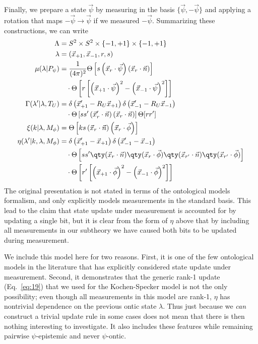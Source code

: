 \documentclass[%
 reprint,
superscriptaddress,
nofootinbib,
 amsmath,amssymb,
 prx, 
 accepted=2019-09-27,
]{quantumarticle}
\begin{document}
Finally, we prepare a state $\vec\psi$ by measuring in the basis
$\{\vec\psi,-\vec\psi\}$ and applying a rotation that maps
$-\vec\psi\to\vec\psi$ if we measured $-\vec\psi$. Summarizing these
constructions, we can write
\begin{align}
  \Lambda &= S^2\times S^2\times\{-1,+1\}\times\{-1,+1\}\nonumber\\
  \lambda &= (\vec x_{+1},\vec x_{-1}, r,s)\nonumber\\
  \mu(\lambda|P_\psi)
          &= \frac{1}{(4\pi)^2}  \Theta\left[ s\left(\vec x_{r}\cdot\vec\psi \right)\left(\vec x_{r}\cdot\vec n \right) \right]\nonumber\\
          &\quad\cdot\Theta\left[ r\left[
            \left( \vec x_{+1}\cdot\vec \psi \right)^2
            -\left( \vec x_{-1} \cdot\vec\psi \right)^2 \right] \right]\nonumber\\
  \Gamma(\lambda'|\lambda,T_U)
          &=
            \delta\left(\vec x_{+1}'-R_U\vec x_{+1}\right)
            \delta\left(\vec x_{-1}'-R_U\vec x_{-1}\right)\nonumber\\
          &\quad\cdot\Theta\left[ ss'\left( \vec x_r'\cdot \vec n\right)\left( \vec x_r\cdot \vec n \right) \right]
            \Theta[rr'] \nonumber\\
  \xi(k|\lambda,M_\phi) 
          &= \Theta\left[ ks\left( \vec x_r\cdot\vec n \right)
            \left( \vec x_r\cdot\vec \phi \right)\right]\nonumber\\
  \eta(\lambda'|k,\lambda,M_\phi)
          &= \delta\left(\vec x_{+1}'-\vec x_{+1}\right)
            \delta\left(\vec x_{-1}'-\vec x_{-1}\right)\nonumber\\
          &\quad\cdot\Theta\left[ ss'\qty( \vec x_r\cdot \vec n)\qty( \vec x_r\cdot \vec\phi)
            \qty( \vec x_{r'}\cdot \vec n)\qty( \vec x_{r'}\cdot \vec\phi)\right]\nonumber\\
          &\quad\cdot\Theta\left[ r'\left[
            \left( \vec x_{+1}\cdot\vec \phi \right)^2
            -\left( \vec x_{-1} \cdot\vec\phi \right)^2 \right] \right]
\end{align}
The original presentation is not stated in terms of the ontological
models formalism, and only explicitly models measurements in the
standard basis. This lead to the claim that state update under
measurement is accounted for by updating a single bit, but it is clear
from the form of $\eta$ above that by including all measurements in
our subtheory we have caused both bits to be updated during
measurement.

We include this model here for two reasons. First, it is one of the
few ontological models in the literature that has explicitly
considered state update under measurement. Second, it demonstrates
that the generic rank-1 update (Eq.~\ref{eq:19}) that we used for the
Kochen-Specker model is not the only possibility; even though all
measurements in this model are rank-1, $\eta$ has nontrivial
dependence on the previous ontic state $\lambda$. Thus just because we
\emph{can} construct a trivial update rule in some cases does not mean
that there is then nothing interesting to investigate. It also
includes these features while remaining pairwise $\psi$-epistemic and
never $\psi$-ontic.
\end{document}
